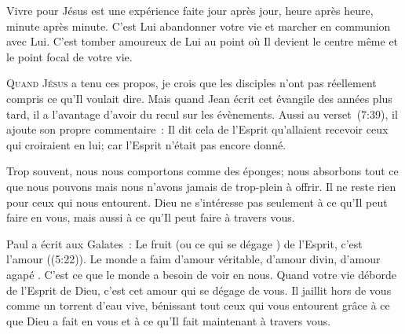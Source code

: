 Vivre pour Jésus est une expérience faite jour après jour,
 heure après heure, minute après minute.
 C'est Lui abandonner votre vie et marcher en communion avec Lui.
 C'est tomber amoureux de Lui au point où Il devient le centre même
 et le point focal de votre vie.

\dvrule






\lettrine{Q}{uand Jésus} a tenu ces propos,
 je crois que les disciples n'ont pas réellement compris
 ce qu'Il voulait dire. Mais quand Jean écrit cet évangile 
 des années plus tard, il a l'avantage d'avoir du recul sur les évènements.
 Aussi au verset~(7:39), il ajoute son propre commentaire~:
 \og Il dit cela de l'Esprit qu'allaient recevoir ceux qui croiraient en lui;
 car l'Esprit n'était pas encore donné. \fg{}


Trop souvent, nous nous comportons comme des éponges;
 nous absorbons tout ce que nous pouvons mais nous n'avons jamais
 de trop-plein à offrir. Il ne reste rien pour ceux qui nous entourent.
 Dieu ne s'intéresse pas seulement à ce qu'Il peut faire en vous,
 mais aussi à ce qu'Il peut faire à travers vous.

Paul a écrit aux Galates~: 
 \og Le fruit (ou \og ce qui se dégage \fg{}) de l'Esprit,
 c'est l'amour \fg{} ((5:22)).
 Le monde a faim d'amour véritable, d'amour divin, d'amour \og agapé \fg{}.
 C'est ce que le monde a besoin de voir en nous. Quand votre vie déborde
 de l'Esprit de Dieu, c'est cet amour qui se dégage de vous.
 Il jaillit hors de vous comme un torrent d'eau vive,
 bénissant tout ceux qui vous entourent grâce à ce que Dieu
 a fait en vous et à ce qu'Il fait maintenant à travers vous.

\dvrule

